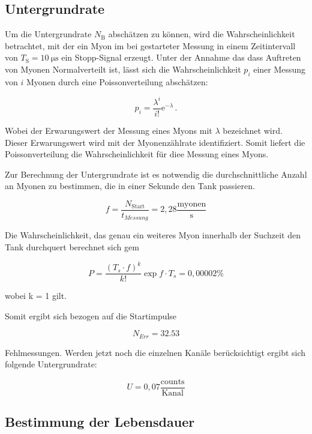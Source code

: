 \subsection{Untergrundrate}
\label{subsec:underground}

Um die Untergrundrate $N_\text{B}$ abschätzen zu können, wird die Wahrscheinlichkeit betrachtet, mit der ein Myon im bei gestarteter Messung in
einem Zeitintervall von $T_\text{S} = \SI{10}{\micro \second}$ ein Stopp-Signal erzeugt. Unter der Annahme das dass Auftreten von Myonen Normalverteilt ist,
lässt sich die Wahrscheinlichkeit $p_i$ einer Messung von $i$ Myonen durch eine Poissonverteilung abschätzen:

\begin{equation*}
p_i = \frac{\lambda^i}{i!}\mathrm{e}^{-\lambda}\,.
\end{equation*}

Wobei der Erwarungswert der Messung eines Myons mit $\lambda$ bezeichnet wird. Dieser Erwarungswert wird mit der Myonenzählrate identifiziert. Somit liefert die Poissonverteilung die Wahrscheinlichkeit
für diee Messung eines Myons.

Zur Berechnung der Untergrundrate ist es notwendig die durchschnittliche Anzahl an Myonen zu bestimmen, die in einer Sekunde den Tank passieren.

\begin{equation}
f = \frac{N_{\text{Start}}}{t_{Messung}} = 2,28 \frac{\text{myonen}}{\text{s}}
\end{equation}

Die Wahrscheinlichkeit, das genau ein weiteres Myon innerhalb der Suchzeit den Tank durchquert berechnet sich gem

\begin{equation}
P = \frac{(T_s \cdot f)^k}{k!} \exp{f \cdot T_s} = 0,00002 \%
\end{equation}

wobei k = 1 gilt.

Somit ergibt sich bezogen auf die Startimpulse 

\begin{equation}
N_{Err} = 32.53
\end{equation}

Fehlmessungen. Werden jetzt noch die einzelnen Kanäle berücksichtigt ergibt sich folgende Untergrundrate:

\begin{equation}
U = 0,07 \frac{\text{counts}}{\text{Kanal}}
\end{equation}
\subsection{Bestimmung der Lebensdauer}
\label{subsec:lifetime}
